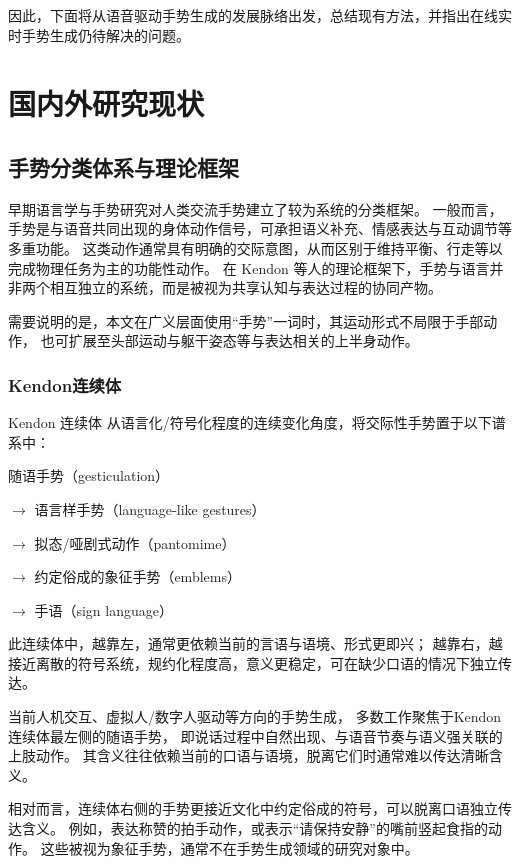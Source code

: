 因此，下面将从语音驱动手势生成的发展脉络出发，总结现有方法，并指出在线实时手势生成仍待解决的问题。

\section{国内外研究现状}

\subsection{手势分类体系与理论框架}
早期语言学与手势研究对人类交流手势建立了较为系统的分类框架\cite{kendon_2004_gesture,mcneill_1992_hand}。
一般而言，手势是与语音共同出现的身体动作信号，可承担语义补充、情感表达与互动调节等多重功能。
这类动作通常具有明确的交际意图，从而区别于维持平衡、行走等以完成物理任务为主的功能性动作。
在 Kendon 等人的理论框架\cite{kendon_2004_gesture}下，手势与语言并非两个相互独立的系统，而是被视为共享认知与表达过程的协同产物。

需要说明的是，本文在广义层面使用“手势”一词时，其运动形式不局限于手部动作，
也可扩展至头部运动与躯干姿态等与表达相关的上半身动作。

\subsubsection{Kendon连续体}
Kendon 连续体\cite{kendon_2004_gesture}
从语言化/符号化程度的连续变化角度，将交际性手势置于以下谱系中：

随语手势（gesticulation） %

$\rightarrow$ 语言样手势（language-like gestures） %

$\rightarrow$ 拟态/哑剧式动作（pantomime） %

$\rightarrow$ 约定俗成的象征手势（emblems） %

$\rightarrow$ 手语（sign language）%

此连续体中，越靠左，通常更依赖当前的言语与语境、形式更即兴；%
越靠右，越接近离散的符号系统，规约化程度高，意义更稳定，可在缺少口语的情况下独立传达。%

当前人机交互、虚拟人/数字人驱动等方向的手势生成，%
多数工作聚焦于Kendon连续体最左侧的随语手势，%
即说话过程中自然出现、与语音节奏与语义强关联的上肢动作。
其含义往往依赖当前的口语与语境，脱离它们时通常难以传达清晰含义。%

相对而言，连续体右侧的手势更接近文化中约定俗成的符号，可以脱离口语独立传达含义。%
例如，表达称赞的拍手动作，或表示“请保持安静”的嘴前竖起食指的动作。
这些被视为象征手势，通常不在手势生成领域的研究对象中。


